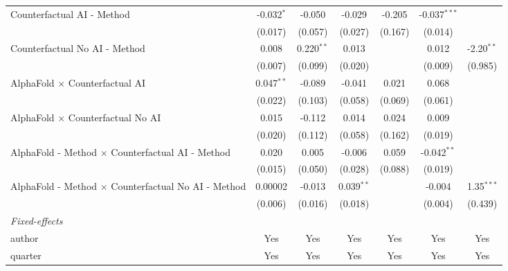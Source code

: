 \begin{tabular}{lcccccc}
   Counterfactual AI - Method                                 & -0.032$^{*}$ & -0.050        & -0.029       & -0.205  & -0.037$^{***}$ &   \\   
                                                              & (0.017)      & (0.057)       & (0.027)      & (0.167) & (0.014)        &   \\   
   Counterfactual No AI - Method                              & 0.008        & 0.220$^{**}$  & 0.013        &         & 0.012          & -2.20$^{**}$\\   
                                                              & (0.007)      & (0.099)       & (0.020)      &         & (0.009)        & (0.985)\\   
   AlphaFold $\times$ Counterfactual AI                       & 0.047$^{**}$ & -0.089        & -0.041       & 0.021   & 0.068          &   \\   
                                                              & (0.022)      & (0.103)       & (0.058)      & (0.069) & (0.061)        &   \\   
   AlphaFold $\times$ Counterfactual No AI                    & 0.015        & -0.112        & 0.014        & 0.024   & 0.009          &   \\   
                                                              & (0.020)      & (0.112)       & (0.058)      & (0.162) & (0.019)        &   \\   
   AlphaFold - Method $\times$ Counterfactual AI - Method     & 0.020        & 0.005         & -0.006       & 0.059   & -0.042$^{**}$  &   \\   
                                                              & (0.015)      & (0.050)       & (0.028)      & (0.088) & (0.019)        &   \\   
   AlphaFold - Method $\times$ Counterfactual No AI - Method  & 0.00002      & -0.013        & 0.039$^{**}$ &         & -0.004         & 1.35$^{***}$\\   
                                                              & (0.006)      & (0.016)       & (0.018)      &         & (0.004)        & (0.439)\\   
   \midrule
   \emph{Fixed-effects}\\
   author                                                     & Yes          & Yes           & Yes          & Yes     & Yes            & Yes\\  
   quarter                                                    & Yes          & Yes           & Yes          & Yes     & Yes            & Yes\\  

\end{tabular}
